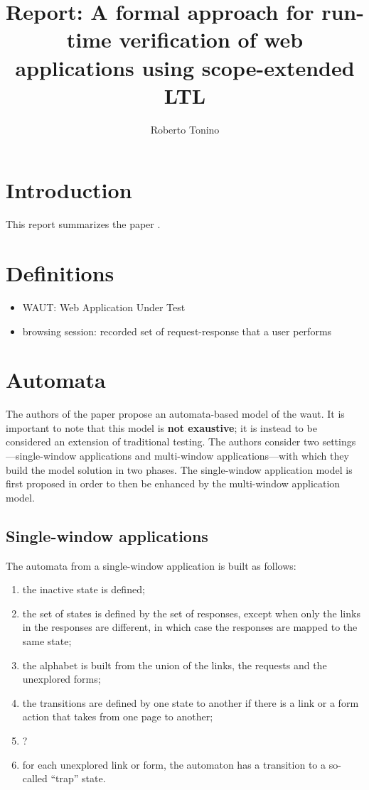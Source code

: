 \documentclass[a4paper,10pt]{article}
\title{Report: A formal approach for run-time verification of web applications using scope-extended LTL}
\author{Roberto Tonino}
\theoremstyle{plain} %
\theoremstyle{definition}
\theoremstyle{remark}
\begin{document}
\maketitle

\tableofcontents

\clearpage

\section{Introduction}

This report summarizes the paper .

\section{Definitions}

\begin{itemize}
  \item WAUT: Web Application Under Test
  \item browsing session: recorded set of request-response that a user performs
\end{itemize}

\section{Automata}

The authors of the paper propose an automata-based model of the \gls{waut}. It is important to note that this model is \textbf{not exaustive}; it is instead to be considered an extension of traditional testing. The authors consider two settings---single-window applications and multi-window applications---with which they build the model solution in two phases. The single-window application model is first proposed in order to then be enhanced by the multi-window application model.

\subsection{Single-window applications}
\label{single-window-applications}

The automata from a single-window application is built as follows:

\begin{enumerate}
  \item the inactive state is defined;
  \item the set of states is defined by the set of responses, except when only the links in the responses are different, in which case the responses are mapped to the same state;
  \item the alphabet is built from the union of the links, the requests and the unexplored forms;
  \item the transitions are defined by one state to another if there is a link or a form action that takes from one page to another;
  \item ?
  \item for each unexplored link or form, the automaton has a transition to a so-called ``trap'' state.
\end{enumerate}
\end{document}
